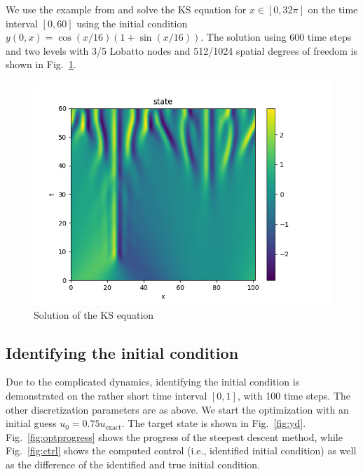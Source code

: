 \documentclass[a4paper]{article} %
\begin{document}
We use the example from \cite{KassamTrefethen2005} and solve the KS equation for $x\in[0,32\pi]$ on the time interval $[0,60]$ using the initial condition $y(0,x) = \cos(x/16)(1+\sin(x/16))$. The solution using 600 time steps and two levels with 3/5 Lobatto nodes and 512/1024 spatial degrees of freedom is shown in Fig.~\ref{fig:KS60}. 

\begin{figure}
\includegraphics[scale=0.7]{figures/solKS_T60_nstep600_nx1024.png}
\caption{Solution of the KS equation}
\label{fig:KS60}
\end{figure}

\subsection{Identifying the initial condition}

Due to the complicated dynamics, identifying the initial condition is demonstrated on the rather short time interval $[0,1]$, with 100 time steps. The other discretization parameters are as above. We start the optimization with an initial guess $u_0 = 0.75 u_\text{exact}$. The target state is shown in Fig.~\ref{fig:yd}. Fig.~\ref{fig:optprogress} shows the progress of the steepest descent method, while Fig.~\ref{fig:ctrl} shows the computed control (i.e., identified initial condition) as well as the difference of the identified and true initial condition.
\end{document}
